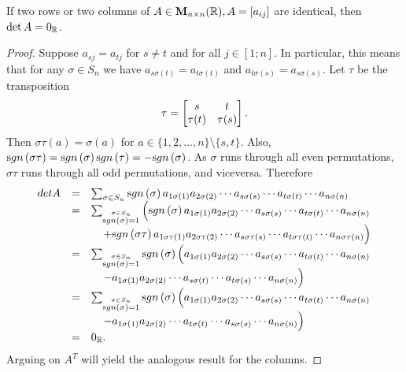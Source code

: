 \begin{lemma}
If two rows or two columns of $A \in {\mathbf M}_{n\times n}( \mathbb{R}), A =
[a_{ij}]$ are identical, then $\det A = 0_{\mathbb{R}}$.
\label{lem:determinant_with_two_identical_rows}\end{lemma}
\begin{proof}
Suppose $a_{sj} = a_{tj}$ for $s\neq t$ and for all $j\in [1;n]$.
In particular, this means that for any $\sigma\in S_n$ we have
$a_{s\sigma (t)} = a_{t\sigma (t)}$ and $a_{t\sigma (s)} =
a_{s\sigma (s)}$.  Let $\tau$ be the transposition
$$\tau =
\begin{bmatrix} s & t \cr \tau (t) & \tau (s) \cr
\end{bmatrix}.
$$Then $\sigma\tau (a) = \sigma (a)$ for $a\in\{1, 2, \ldots , n\}\setminus
\{s,t\}$. Also, $\sgn{\sigma\tau} = \sgn{\sigma}\sgn{\tau} =
-\sgn{\sigma}$. As $\sigma$ runs through all even permutations,
$\sigma\tau$ runs through all odd permutations, and viceversa.
Therefore
$$\begin{array}{lll}det A & = & \sum _{\sigma \in S_n}\sgn{\sigma} a_{1\sigma (1)}a_{2\sigma (2)}\cdots a_{s\sigma
(s)}\cdots a_{t\sigma (t)} \cdots a_{n\sigma (n)} \\
& = &  \sum _{\stackrel{\sigma \in S_n}{\sgn{\sigma} =
1}}\left(\sgn{\sigma} a_{1\sigma (1)}a_{2\sigma (2)}\cdots
a_{s\sigma (s)}\cdots a_{t\sigma (t)} \cdots a_{n\sigma (n)}\right.\\
& & \left. \quad + \sgn{\sigma\tau} a_{1\sigma\tau
(1)}a_{2\sigma\tau (2)}\cdots a_{s\sigma\tau (s)}\cdots
a_{t\sigma\tau (t)} \cdots
a_{n\sigma\tau (n)}\right) \\
& = &  \sum _{\stackrel{\sigma \in S_n}{\sgn{\sigma} =
1}}\sgn{\sigma}\left( a_{1\sigma (1)}a_{2\sigma (2)}\cdots
a_{s\sigma (s)}\cdots a_{t\sigma (t)} \cdots a_{n\sigma (n)}\right.\\
& & \left. \quad -  a_{1\sigma (1)}a_{2\sigma (2)}\cdots
a_{s\sigma (t)}\cdots a_{t\sigma (s)} \cdots
a_{n\sigma (n)}\right) \\
& = &  \sum _{\stackrel{\sigma \in S_n}{\sgn{\sigma} =
1}}\sgn{\sigma}\left( a_{1\sigma (1)}a_{2\sigma (2)}\cdots
a_{s\sigma (s)}\cdots a_{t\sigma (t)} \cdots a_{n\sigma (n)}\right.\\
& & \left. \quad -  a_{1\sigma (1)}a_{2\sigma (2)}\cdots
a_{t\sigma (t)}\cdots a_{s\sigma (s)} \cdots
a_{n\sigma (n)}\right) \\
& = & 0_{\bbR}.
\end{array}$$
Arguing on $A^T$ will yield the analogous result for the columns.
\end{proof}
